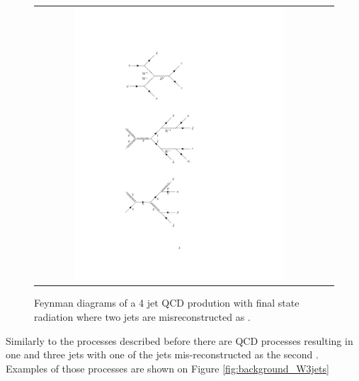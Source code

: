 \begin{figure}[tbh!]
	\centering
	\begin{tabular}{cc}
		\includegraphics[width=0.75\textwidth]{diagrams/pics/background_QCDfinrad.pdf}
	\end{tabular}
	\caption{Feynman diagrams of a 4 jet QCD prodution with final state radiation where two jets are misreconstructed as \hadtau. }
	\label{fig:background_QCDfinrad}
\end{figure}

Similarly to the processes described before there are QCD processes resulting in one \hadtau and three jets with one of the jets mis-reconstructed as the second \hadtau. Examples of those processes are shown on Figure \ref{fig:background_W3jets}

